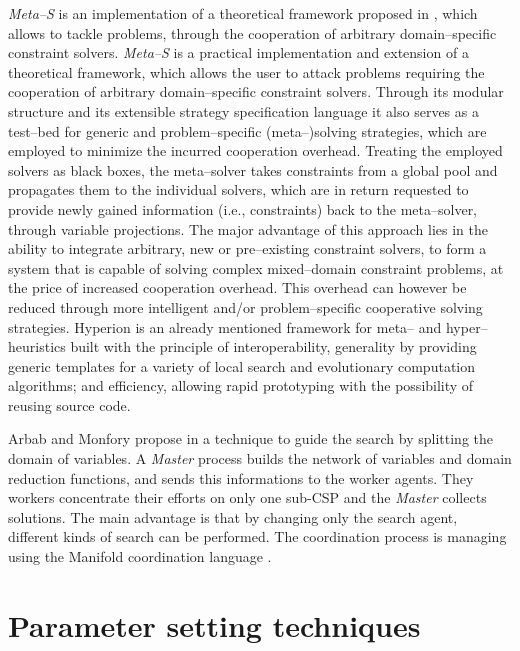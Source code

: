 {\it Meta--S} is an implementation of a theoretical framework proposed in \cite{Frank2003}, which allows to tackle problems, through the cooperation of arbitrary domain--specific constraint solvers. {\it Meta--S} \cite{Frank2003} is a practical implementation and extension of a theoretical framework, which allows the user to attack problems requiring the cooperation of arbitrary domain--specific constraint solvers. Through its modular structure and its extensible strategy specification language it also serves as a test--bed for generic and problem--specific (meta--)solving strategies, which are employed to minimize the incurred cooperation overhead. Treating the employed solvers as black boxes, the meta--solver takes constraints from a global pool and propagates them to the individual solvers, which are in return requested to provide newly gained information (i.e., constraints) back to the meta--solver, through variable projections. The major advantage of this approach lies in the ability to integrate arbitrary, new or pre--existing constraint solvers, to form a system that is capable of solving complex mixed--domain constraint problems, at the price of increased cooperation overhead. This overhead can however be reduced through more intelligent and/or problem--specific cooperative solving strategies. {\sc Hyperion} \cite{Brownlee2014} is an already mentioned framework for meta-- and hyper--heuristics built with the principle of interoperability, generality by providing generic templates for a variety of local search and evolutionary computation algorithms; and efficiency, allowing rapid prototyping with the possibility of reusing source code.

Arbab and Monfory propose in \cite{Arbab2000} a technique to guide the search by splitting the domain of variables. A \textit{Master} process builds the network of variables and domain reduction functions, and sends this informations to the worker agents. They workers concentrate their efforts on only one sub-CSP and the \textit{Master} collects solutions. The main advantage is that by changing only the search agent, different kinds of search can be performed. The coordination process is managing using the {\sc Manifold} coordination language \cite{Arbab1995}.

\section{Parameter setting techniques}
\label{sec:tunning}


